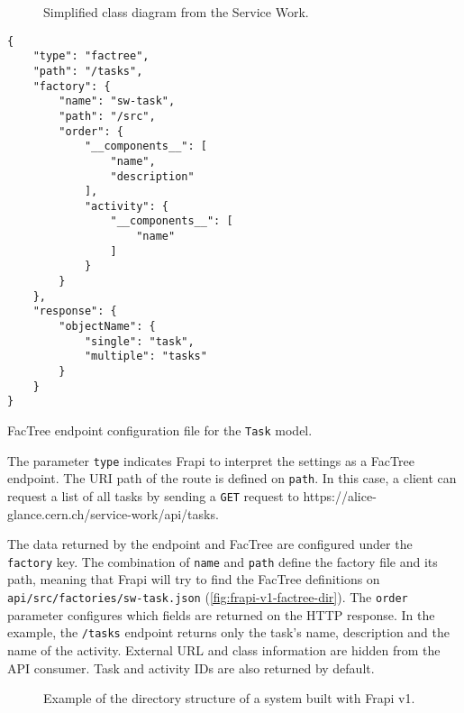 \begin{figure}[htbp]
  \centering
  
  \caption{Simplified class diagram from the Service Work.}
  \label{fig:class-diagram-sw-task}
\end{figure}

\begin{listing}[htbp]
\begin{verbatim}
{
    "type": "factree",
    "path": "/tasks",
    "factory": {
        "name": "sw-task",
        "path": "/src",
        "order": {
            "__components__": [
                "name",
                "description"
            ],
            "activity": {
                "__components__": [
                    "name"
                ]
            }
        }
    },
    "response": {
        "objectName": {
            "single": "task",
            "multiple": "tasks"
        }
    }
}
\end{verbatim}
\caption{FacTree endpoint configuration file for the \texttt{Task} model.}
\label{code:task-factree-endpoint-settings}
\end{listing}

The parameter \texttt{type} indicates Frapi to interpret the settings as a FacTree endpoint. The URI path of the route is defined on \texttt{path}. In this case, a client can request a list of all tasks by sending a \texttt{GET} request to https://alice-glance.cern.ch/service-work/api/tasks.

The data returned by the endpoint and FacTree are configured under the \texttt{factory} key.  The combination of \texttt{name} and \texttt{path} define the factory file and its path, meaning that Frapi will try to find the FacTree definitions on \texttt{api/src/factories/sw-task.json} (\autoref{fig:frapi-v1-factree-dir}). The \texttt{order} parameter configures which fields are returned on the HTTP response. In the example, the \texttt{/tasks} endpoint returns only the task's name, description and the name of the activity. External URL and class information are hidden from the API consumer. Task and activity IDs are also returned by default.

\begin{figure}
\centering
\begin{minipage}{0.9\textwidth}
\end{minipage}
\caption{Example of the directory structure of a system built with Frapi v1.}
\label{fig:frapi-v1-factree-dir}
\end{figure}

